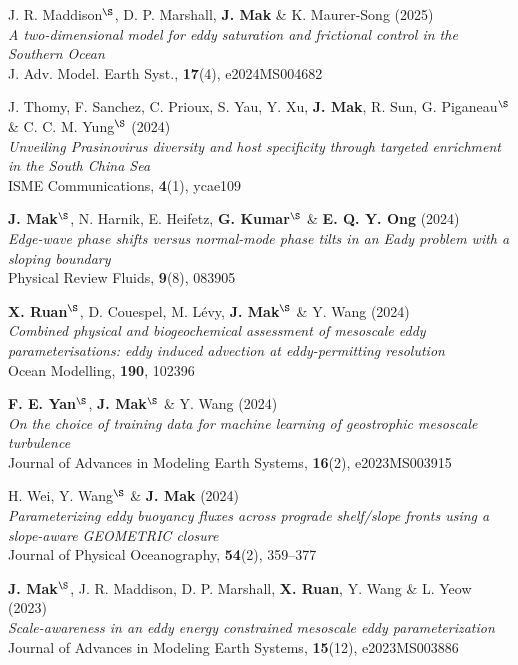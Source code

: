 \documentclass[letterpaper]{article}
\renewenvironment{itemize}{
  \begin{list}{}{
    \setlength{\leftmargin}{1.5em}
  }
}{
  \end{list}
}
\begin{document}
\begin{itemize}
\item[25.] J. R. Maddison$^{\S}$, D. P. Marshall, \textbf{J. Mak} \& K. Maurer-Song (2025)\\
\textit{A two-dimensional model for eddy saturation and frictional control in the Southern Ocean}\\
J. Adv. Model. Earth Syst., \textbf{17}(4), e2024MS004682

\item[24.] J. Thomy, F. Sanchez, C. Prioux, S. Yau, Y. Xu, \textbf{J. Mak}, R. Sun, G. Piganeau$^{\S}$ \& C. C. M. Yung$^{\S}$ (2024)\\
\textit{Unveiling Prasinovirus diversity and host specificity through targeted enrichment in the South China Sea}\\
ISME Communications, \textbf{4}(1), ycae109

\item[23.] \textbf{J. Mak}$^{\S}$, N. Harnik, E. Heifetz, \textbf{G. Kumar}$^{\S}$ \& \textbf{E. Q. Y. Ong} (2024)\\
\textit{Edge-wave phase shifts versus normal-mode phase tilts in an Eady problem with a sloping boundary}\\
Physical Review Fluids, \textbf{9}(8), 083905

\item[22.] \textbf{X. Ruan}$^{\S}$, D. Couespel, M. L\'evy, \textbf{J. Mak}$^{\S}$ \& Y. Wang (2024)\\
\textit{Combined physical and biogeochemical assessment of mesoscale eddy parameterisations: eddy induced advection at eddy-permitting resolution}\\
Ocean Modelling, \textbf{190}, 102396

\item[21.] \textbf{F. E. Yan}$^{\S}$, \textbf{J. Mak}$^{\S}$ \& Y. Wang (2024)\\
\textit{On the choice of training data for machine learning of geostrophic mesoscale turbulence}\\
Journal of Advances in Modeling Earth Systems, \textbf{16}(2), e2023MS003915

\item[20.] H. Wei, Y. Wang$^{\S}$ \& \textbf{J. Mak} (2024)\\
\textit{Parameterizing eddy buoyancy fluxes across prograde shelf/slope fronts using a slope-aware GEOMETRIC closure}\\
Journal of Physical Oceanography, \textbf{54}(2), 359--377

\item[19.] \textbf{J. Mak}$^{\S}$, J. R. Maddison, D. P. Marshall, \textbf{X. Ruan}, Y. Wang \& L. Yeow (2023)\\
\textit{Scale-awareness in an eddy energy constrained mesoscale eddy parameterization}\\
Journal of Advances in Modeling Earth Systems, \textbf{15}(12), e2023MS003886


\end{itemize}
\end{document}

